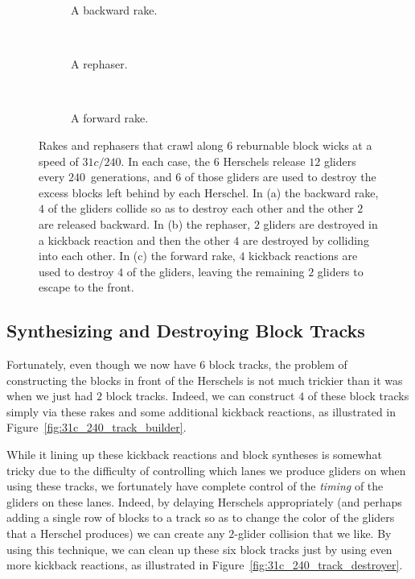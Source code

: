 \begin{figure}[!htb]
	\centering
	\begin{subfigure}{0.28\textwidth}
		\centering
		\caption{A backward rake.}\label{fig:31c_240_back_rake}
	\end{subfigure} \ \ \begin{subfigure}{0.28\textwidth}
		\centering
		\caption{A rephaser.}\label{fig:31c_240_rephaser}
	\end{subfigure} \ \ \begin{subfigure}{0.4\textwidth}
		\centering
		\caption{A forward rake.}\label{fig:31c_240_forward_rake}
	\end{subfigure}
	\caption{Rakes and rephasers that crawl along $6$ reburnable block wicks at a speed of $31c/240$. In each case, the $6$ Herschels release $12$ gliders every $240$~generations, and $6$ of those gliders are used to destroy the excess blocks left behind by each Herschel. In (a) the backward rake, $4$ of the gliders collide so as to destroy each other and the other $2$ are released backward. In (b) the rephaser, $2$ gliders are destroyed in a kickback reaction and then the other $4$ are destroyed by colliding into each other. In (c) the forward rake, $4$ kickback reactions are used to destroy $4$ of the gliders, leaving the remaining $2$ gliders to escape to the front.}\label{fig:31c_240_rakes_and_rephaser}
\end{figure}


\subsection{Synthesizing and Destroying Block Tracks}\label{sec:silverfish_synth_destroy_blocks}

Fortunately, even though we now have $6$ block tracks, the problem of constructing the blocks in front of the Herschels is not much trickier than it was when we just had $2$ block tracks. Indeed, we can construct $4$ of these block tracks simply via these rakes and some additional kickback reactions, as illustrated in Figure~\ref{fig:31c_240_track_builder}.

While it lining up these kickback reactions and block syntheses is somewhat tricky due to the difficulty of controlling which lanes we produce gliders on when using these tracks, we fortunately have complete control of the \emph{timing} of the gliders on these lanes. Indeed, by delaying Herschels appropriately (and perhaps adding a single row of blocks to a track so as to change the color of the gliders that a Herschel produces) we can create any $2$-glider collision that we like. By using this technique, we can clean up these six block tracks just by using even more kickback reactions, as illustrated in Figure~\ref{fig:31c_240_track_destroyer}.

